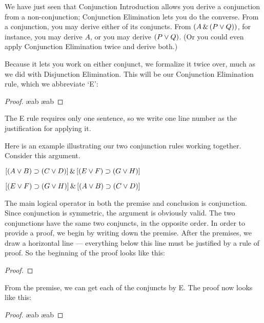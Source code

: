 We have just seen that Conjunction Introduction allows you derive a conjunction from a non-conjunction; Conjunction Elimination lets you do the converse. From a conjunction, you may derive either of its conjuncts. From $(A \,\&\, (P \vee Q))$, for instance, you may derive $A$, or you may derive $(P \vee Q)$. (Or you could even apply Conjunction Elimination twice and derive both.)

Because it lets you work on either conjunct, we formalize it twice over, much as we did with Disjunction Elimination. This will be our Conjunction Elimination rule, which we abbreviate `{\eand}E':

\begin{proof}
	\metaA{} \ae{ab}
	\metaB{} \ae{ab}
\end{proof}

The {\eand}E rule requires only one sentence, so we write one line number as the justification for applying it.

Here is an example illustrating our two conjunction rules working together. Consider this argument.
\begin{earg}
\item[] $[(A\vee B)\supset(C\vee D)] \,\&\, [(E \vee F) \supset (G\vee H)]$
\item[\therefore] $[(E \vee F) \supset (G\vee H)] \,\&\, [(A\vee B)\supset(C\vee D)]$
\end{earg}
The main logical operator in both the premise and conclusion is conjunction. Since conjunction is symmetric, the argument is obviously valid. The two conjunctions have the same two conjuncts, in the opposite order. In order to provide a proof, we begin by writing down the premise. After the premises, we draw a horizontal line --- everything below this line must be justified by a rule of proof. So the beginning of the proof looks like this:

\begin{proof}
\end{proof}

From the premise, we can get each of the conjuncts by {\eand}E. The proof now looks like this:

\begin{proof}
	 \ae{ab}
	 \ae{ab}
\end{proof}

